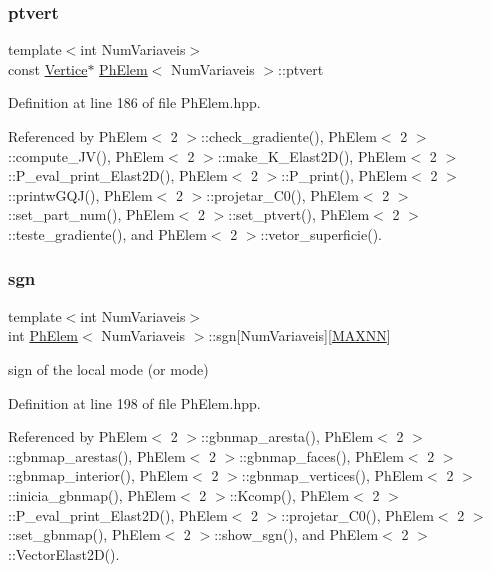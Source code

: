 \mbox{\label{classPhElem_a92acc9f8f36991ce851df5e462425d3c}} 
\subsubsection{\texorpdfstring{ptvert}{ptvert}}
{\footnotesize\ttfamily template$<$int Num\+Variaveis$>$ \\
const \hyperlink{structVertice}{Vertice}$\ast$ \hyperlink{classPhElem}{Ph\+Elem}$<$ Num\+Variaveis $>$\+::ptvert\hspace{0.3cm}{\ttfamily [protected]}}



Definition at line 186 of file Ph\+Elem.\+hpp.



Referenced by Ph\+Elem$<$ 2 $>$\+::check\+\_\+gradiente(), Ph\+Elem$<$ 2 $>$\+::compute\+\_\+\+J\+V(), Ph\+Elem$<$ 2 $>$\+::make\+\_\+\+K\+\_\+\+Elast2\+D(), Ph\+Elem$<$ 2 $>$\+::\+P\+\_\+eval\+\_\+print\+\_\+\+Elast2\+D(), Ph\+Elem$<$ 2 $>$\+::\+P\+\_\+print(), Ph\+Elem$<$ 2 $>$\+::printw\+G\+Q\+J(), Ph\+Elem$<$ 2 $>$\+::projetar\+\_\+\+C0(), Ph\+Elem$<$ 2 $>$\+::set\+\_\+part\+\_\+num(), Ph\+Elem$<$ 2 $>$\+::set\+\_\+ptvert(), Ph\+Elem$<$ 2 $>$\+::teste\+\_\+gradiente(), and Ph\+Elem$<$ 2 $>$\+::vetor\+\_\+superficie().

\mbox{\label{classPhElem_a5bb9ccd4ccebf12ff0937d807c443caf}} 
\subsubsection{\texorpdfstring{sgn}{sgn}}
{\footnotesize\ttfamily template$<$int Num\+Variaveis$>$ \\
int \hyperlink{classPhElem}{Ph\+Elem}$<$ Num\+Variaveis $>$\+::sgn\mbox{[}Num\+Variaveis\mbox{]}\mbox{[}\hyperlink{MyOptions_8h_a2f91e7a0b4bf68a62a0f3d38904dea2c}{M\+A\+X\+NN}\mbox{]}\hspace{0.3cm}{\ttfamily [protected]}}



sign of the local mode (or mode) 



Definition at line 198 of file Ph\+Elem.\+hpp.



Referenced by Ph\+Elem$<$ 2 $>$\+::gbnmap\+\_\+aresta(), Ph\+Elem$<$ 2 $>$\+::gbnmap\+\_\+arestas(), Ph\+Elem$<$ 2 $>$\+::gbnmap\+\_\+faces(), Ph\+Elem$<$ 2 $>$\+::gbnmap\+\_\+interior(), Ph\+Elem$<$ 2 $>$\+::gbnmap\+\_\+vertices(), Ph\+Elem$<$ 2 $>$\+::inicia\+\_\+gbnmap(), Ph\+Elem$<$ 2 $>$\+::\+Kcomp(), Ph\+Elem$<$ 2 $>$\+::\+P\+\_\+eval\+\_\+print\+\_\+\+Elast2\+D(), Ph\+Elem$<$ 2 $>$\+::projetar\+\_\+\+C0(), Ph\+Elem$<$ 2 $>$\+::set\+\_\+gbnmap(), Ph\+Elem$<$ 2 $>$\+::show\+\_\+sgn(), and Ph\+Elem$<$ 2 $>$\+::\+Vector\+Elast2\+D().

